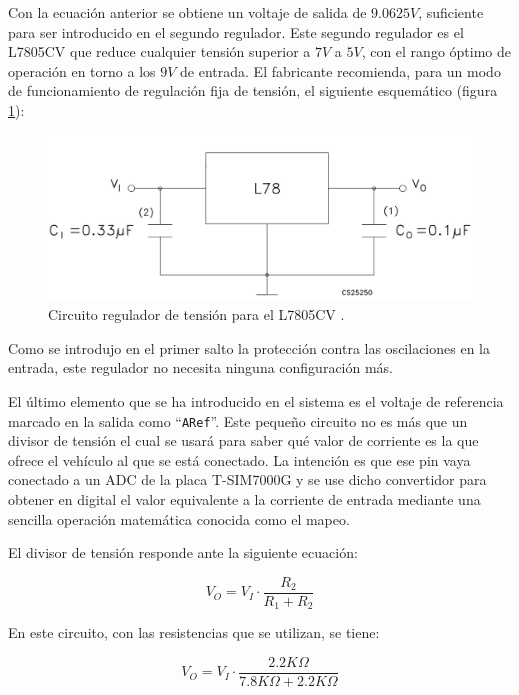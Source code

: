 Con la ecuación anterior se obtiene un voltaje de salida de $9.0625V$, suficiente
para ser introducido en el segundo regulador. Este segundo regulador es el
L7805CV que reduce cualquier tensión superior a $7V$ a $5V$, con el rango óptimo
de operación en torno a los $9V$ de entrada. El fabricante recomienda, para un
modo de funcionamiento de regulación fija de tensión, el siguiente esquemático
(figura \ref{fig:l78}):

\begin{figure}[H]
  \centering
  \includegraphics[width=\linewidth]{images/fixed-voltage.png}
  \caption{Circuito regulador de tensión para el L7805CV \cite{L7805CVSTMicroelectronicsMouser}.}
  \label{fig:l78}
\end{figure}

Como se introdujo en el primer salto la protección contra las oscilaciones en la
entrada, este regulador no necesita ninguna configuración más.

El último elemento que se ha introducido en el sistema es el voltaje de referencia
marcado en la salida como ``\texttt{ARef}''. Este pequeño circuito no es más que un
divisor de tensión el cual se usará para saber qué valor de corriente es la que ofrece
el vehículo al que se está conectado. La intención es que ese pin vaya conectado a un
\ac{ADC} de la placa T-SIM7000G y se use dicho convertidor para obtener en digital
el valor equivalente a la corriente de entrada mediante una sencilla operación matemática
conocida como el mapeo.

El divisor de tensión responde ante la siguiente ecuación:

\begin{equation*}
  V_O = V_I \cdot \frac{R_2}{R_1 + R_2}
\end{equation*}

En este circuito, con las resistencias que se utilizan, se tiene:

\begin{equation*}
  V_O = V_I \cdot \frac{2.2K\Omega}{7.8K\Omega + 2.2K\Omega}
\end{equation*}

